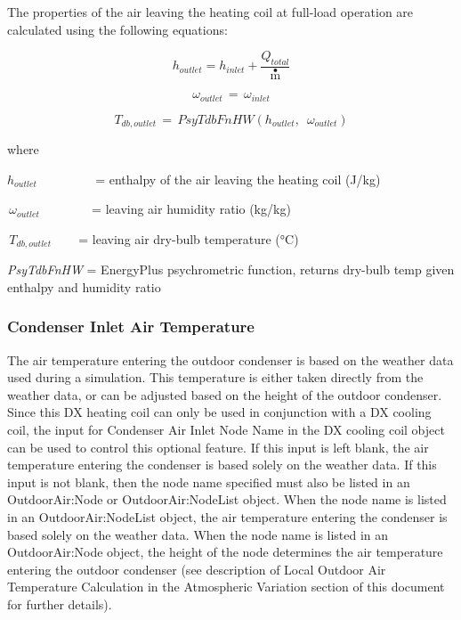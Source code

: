 The properties of the air leaving the heating coil at full-load operation are calculated using the following equations:

\begin{equation}
  h_{outlet} = h_{inlet} + \frac{Q_{total}}{{\mathop m\limits^ \bullet }}
\end{equation}

\begin{equation}
{\omega_{outlet}}\, = \,{\omega_{inlet}}
\end{equation}

\begin{equation}
{T_{db,outlet}}\, = \,PsyTdbFnHW({h_{outlet}},\,\,\,{\omega_{outlet}})
\end{equation}

where

\({h_{outlet}}\) ~~~~~~~~ = enthalpy of the air leaving the heating coil (J/kg)

\(\,{\omega_{outlet}}\) ~~~~~~~ = leaving air humidity ratio (kg/kg)

\(\,{T_{db,outlet}}\) ~~~ = leaving air dry-bulb temperature (°C)

\emph{PsyTdbFnHW} = EnergyPlus psychrometric function, returns dry-bulb temp given enthalpy and humidity ratio

\subsubsection{Condenser Inlet Air Temperature}\label{condenser-inlet-air-temperature-1}

The air temperature entering the outdoor condenser is based on the weather data used during a simulation. This temperature is either taken directly from the weather data, or can be adjusted based on the height of the outdoor condenser. Since this DX heating coil can only be used in conjunction with a DX cooling coil, the input for Condenser Air Inlet Node Name in the DX cooling coil object can be used to control this optional feature. If this input is left blank, the air temperature entering the condenser is based solely on the weather data. If this input is not blank, then the node name specified must also be listed in an OutdoorAir:Node or OutdoorAir:NodeList object. When the node name is listed in an OutdoorAir:NodeList object, the air temperature entering the condenser is based solely on the weather data. When the node name is listed in an OutdoorAir:Node object, the height of the node determines the air temperature entering the outdoor condenser (see description of Local Outdoor Air Temperature Calculation in the Atmospheric Variation section of this document for further details).

